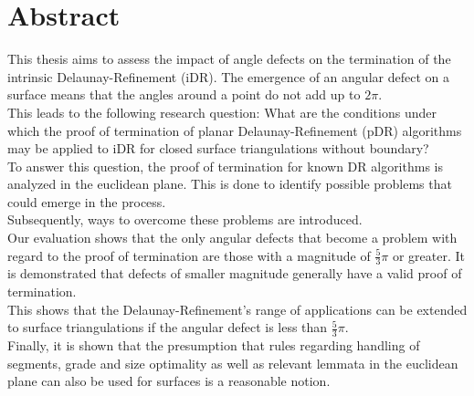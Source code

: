 \chapter*{Abstract}
This thesis aims to assess the impact of angle defects on the termination of the intrinsic Delaunay-Refinement (iDR). The emergence of an angular defect on a surface means that the angles around a point do not add up to $2\pi$. \\
This leads to the following research question: What are the conditions under which the proof of termination of planar Delaunay-Refinement (pDR) algorithms may be applied to iDR for closed surface triangulations without boundary? \\
To answer this question, the proof of termination for known DR algorithms is analyzed in the euclidean plane. This is done to identify possible problems that could emerge in the process. \\
Subsequently, ways to overcome these problems are introduced.\\ Our evaluation shows that the only angular defects that become a problem with regard to the proof of termination are those with a magnitude of $\frac{5}{3}\pi$ or greater. It is demonstrated that defects of smaller magnitude generally have a valid proof of termination.\\
This shows that the Delaunay-Refinement’s range of applications can be extended to surface triangulations if the angular defect is less than $\frac{5}{3}\pi$. \\
Finally, it is shown that the presumption that rules regarding handling of segments, grade and size optimality as well as relevant lemmata in the euclidean plane can also be used for surfaces is a reasonable notion.

